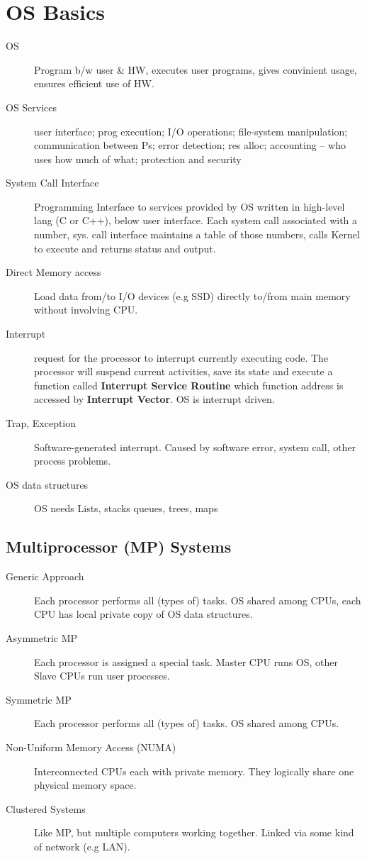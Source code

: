 \section*{OS Basics}
\begin{description}
  \item[OS] Program b/w user \& HW, executes user programs, gives convinient usage, ensures efficient use of HW.
  \item[OS Services] user interface; prog execution; I/O operations; file-system manipulation; communication between Ps; error detection; res alloc; accounting – who uses how much of what; protection and security
    \item[System Call Interface] Programming Interface to services provided by OS written in high-level lang (C or C++), below user interface. Each system call associated with a number, sys. call interface maintains a table of those numbers, calls Kernel to execute and returns status and output.
  \item[Direct Memory access] Load data from/to I/O devices (e.g SSD) directly to/from main memory without involving CPU.
  \item[Interrupt] request for the processor to interrupt currently executing code. The processor will suspend current activities, save its state and execute a function called \textbf{Interrupt Service Routine} which function address is accessed by \textbf{Interrupt Vector}. OS is interrupt driven.
  \item[Trap, Exception] Software-generated interrupt. Caused by software error, system call, other process problems.
  \item[OS data structures] OS needs Lists, stacks queues, trees, maps
\end{description}

\subsection*{Multiprocessor (MP) Systems}
\begin{description}
  \item[Generic Approach] Each processor performs all (types of) tasks. OS shared among CPUs, each CPU has local private copy of OS data structures.
  \item[Asymmetric MP] Each processor is assigned a special task. Master CPU runs OS, other Slave CPUs run user processes.
  \item[Symmetric MP] Each processor performs all (types of) tasks. OS shared among CPUs.
  \item[Non-Uniform Memory Access (NUMA)] Interconnected CPUs each with private memory. They logically share one physical memory space.
  \item[Clustered Systems] Like MP, but multiple computers working together. Linked via some kind of network (e.g LAN).
\end{description}


